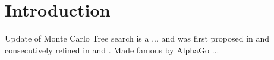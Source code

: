 \section{Introduction}
Update of \cite{browne2012survey}
Monte Carlo Tree search is a ... and was first proposed in \cite{chang2005adaptive} and consecutively refined in \cite{coulom2006efficient} and \cite{chaslot2008monte}. Made famous by AlphaGo \cite{silver2017mastering} ... 